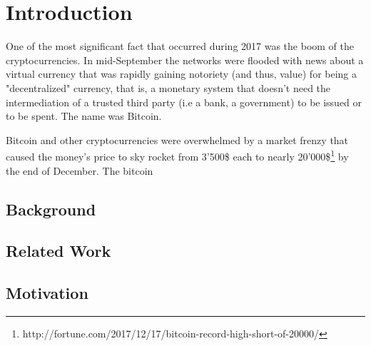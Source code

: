 
	\chapter{Introduction}
		One of the most significant fact that occurred during 2017 was the boom of the cryptocurrencies. In mid-September the networks were flooded with news about a virtual currency that was rapidly gaining notoriety (and thus, value) for being a "decentralized" currency, that is, a monetary system that doesn't need the intermediation of a trusted third party (i.e a bank, a government) to be issued or to be spent. The name was Bitcoin.
		
		Bitcoin and other cryptocurrencies were overwhelmed by a market frenzy that caused the money's price to sky rocket from 3'500\$ each to nearly 20'000\$\footnote{http://fortune.com/2017/12/17/bitcoin-record-high-short-of-20000/} by the end of December. The bitcoin
	\section{Background}
	\section{Related Work}
	\section{Motivation}
